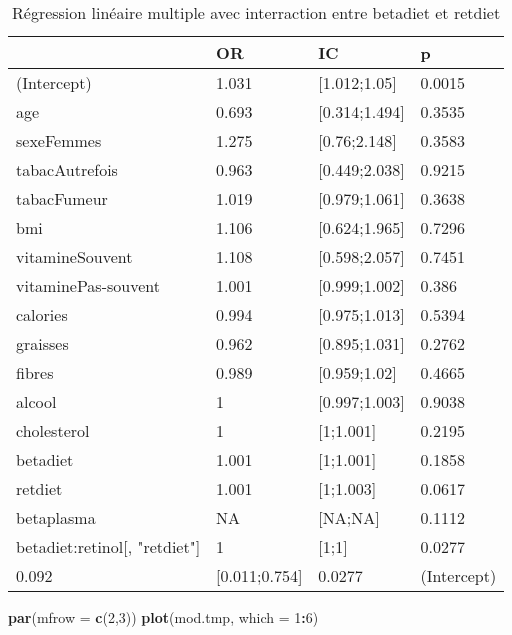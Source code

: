 \documentclass[]{article}
\newenvironment{Shaded}{\begin{snugshade}}{\end{snugshade}}
\newcommand{\KeywordTok}[1]{\textcolor[rgb]{0.13,0.29,0.53}{\textbf{#1}}}
\newcommand{\DataTypeTok}[1]{\textcolor[rgb]{0.13,0.29,0.53}{#1}}
\newcommand{\DecValTok}[1]{\textcolor[rgb]{0.00,0.00,0.81}{#1}}
\newcommand{\OperatorTok}[1]{\textcolor[rgb]{0.81,0.36,0.00}{\textbf{#1}}}
\newcommand{\NormalTok}[1]{#1}
\begin{document}
\begin{table}

\caption{\label{tab:unnamed-chunk-93}Régression linéaire multiple avec interraction entre betadiet et retdiet}
\centering
\begin{tabular}[t]{l|l|l|l}
\hline
  & OR & IC & p\\
\hline
\rowcolor[HTML]{BBD2E1}  (Intercept) & 1.031 & [1.012;1.05] & 0.0015\\
\hline
age & 0.693 & [0.314;1.494] & 0.3535\\
\hline
\rowcolor[HTML]{BBD2E1}  sexeFemmes & 1.275 & [0.76;2.148] & 0.3583\\
\hline
tabacAutrefois & 0.963 & [0.449;2.038] & 0.9215\\
\hline
\rowcolor[HTML]{BBD2E1}  tabacFumeur & 1.019 & [0.979;1.061] & 0.3638\\
\hline
bmi & 1.106 & [0.624;1.965] & 0.7296\\
\hline
\rowcolor[HTML]{BBD2E1}  vitamineSouvent & 1.108 & [0.598;2.057] & 0.7451\\
\hline
vitaminePas-souvent & 1.001 & [0.999;1.002] & 0.386\\
\hline
\rowcolor[HTML]{BBD2E1}  calories & 0.994 & [0.975;1.013] & 0.5394\\
\hline
graisses & 0.962 & [0.895;1.031] & 0.2762\\
\hline
\rowcolor[HTML]{BBD2E1}  fibres & 0.989 & [0.959;1.02] & 0.4665\\
\hline
alcool & 1 & [0.997;1.003] & 0.9038\\
\hline
\rowcolor[HTML]{BBD2E1}  cholesterol & 1 & [1;1.001] & 0.2195\\
\hline
betadiet & 1.001 & [1;1.001] & 0.1858\\
\hline
\rowcolor[HTML]{BBD2E1}  retdiet & 1.001 & [1;1.003] & 0.0617\\
\hline
betaplasma & NA & [NA;NA] & 0.1112\\
\hline
\rowcolor[HTML]{BBD2E1}  betadiet:retinol[, "retdiet"] & 1 & [1;1] & 0.0277\\
\hline
0.092 & [0.011;0.754] & 0.0277 & (Intercept)\\
\hline
\end{tabular}
\end{table}

\begin{Shaded}
\begin{Highlighting}[]
\KeywordTok{par}\NormalTok{(}\DataTypeTok{mfrow =} \KeywordTok{c}\NormalTok{(}\DecValTok{2}\NormalTok{,}\DecValTok{3}\NormalTok{))}
\KeywordTok{plot}\NormalTok{(mod.tmp, }\DataTypeTok{which =} \DecValTok{1}\OperatorTok{:}\DecValTok{6}\NormalTok{)}
\end{Highlighting}
\end{Shaded}
\end{document}
